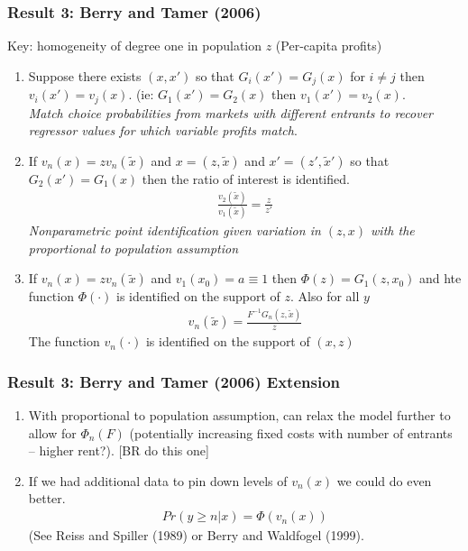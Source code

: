 \documentclass[xcolor=pdftex,dvipsnames,table,mathserif]{beamer}
\begin{document}
\begin{frame}
\frametitle{Result 3: Berry and Tamer (2006)}
\footnotesize
Key: homogeneity of degree one in population $z$ (Per-capita profits)
\begin{enumerate}
\item Suppose there exists $(x,x')$ so that $G_i(x') = G_j(x)$ for $i \neq j$ then $v_i(x') = v_j(x)$. (ie: $G_1(x') = G_2(x)$ then $v_1(x') = v_2(x)$.\\
\textit{Match choice probabilities from markets with different entrants to recover regressor values for which variable profits match}.
\item If $v_n(x) = z v_n(\tilde{x})$ and $x = (z,\tilde{x})$ and $x' = (z',\tilde{x}')$ so that $G_2(x') = G_1(x)$ then the ratio of interest is identified.
\begin{eqnarray*}
\frac{v_2(\tilde{x})} {v_1(\tilde{x})}  = \frac{z}{z'}
\end{eqnarray*}
\textit{Nonparametric point identification given variation in $(z,x)$ with the proportional to population assumption}
\item If $v_n(x) = z v_n(\tilde{x})$ and $v_1(x_0) = a \equiv 1$ then $\Phi(z) = G_1(z,x_0)$ and hte function $\Phi(\cdot)$ is identified on the support of $z$. Also for all $y$ 
\begin{eqnarray*}
v_n(\tilde{x}) = \frac{F^{-1}G_n(z,\tilde{x})}{z}
\end{eqnarray*}
The function $v_n(\cdot)$ is identified on the support of $(x,z)$
\end{enumerate}
\end{frame}

\begin{frame}
\frametitle{Result 3: Berry and Tamer (2006) Extension}
\begin{enumerate}
\item With proportional to population assumption, can relax the model further to allow for $\Phi_n(F)$ (potentially increasing fixed costs with number of entrants -- higher rent?). [BR do this one]
\item If we had additional data to pin down levels of $v_n(x)$ we could do even better.
\begin{eqnarray*}
Pr(y \geq n | x) = \Phi(v_n(x))
\end{eqnarray*}
(See Reiss and Spiller (1989) or Berry and Waldfogel (1999).
\end{enumerate}
\end{frame}
\end{document}
